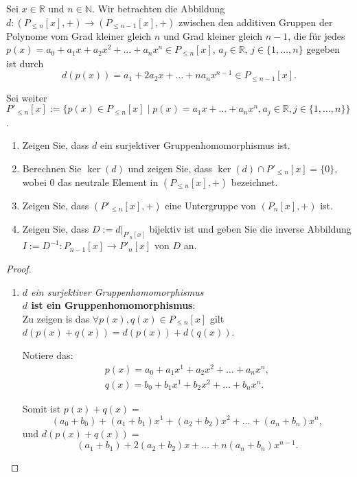 \documentclass{../problemset}
\begin{document}
\begin{problem}
Sei $x \in \mathbb{R}$ und $n \in \mathbb{N}$.
Wir betrachten die Abbildung $d: (P_{\le n }[x], +) \to (P_{\le n-1}[x], +)$ zwischen den additiven Gruppen der Polynome vom Grad kleiner gleich $n$ und Grad kleiner gleich $n - 1$, die für jedes $p(x) = a_0 + a_1x + a_2x^2 + \ldots + a_nx^n \in P_{\le n}[x]$, $a_j \in \mathbb{R}$, $j \in \{1, \ldots, n\}$ gegeben ist durch \[
	d(p(x)) = a_1 + 2a_2x + \ldots + na_nx^{n-1} \in P_{\le n-1}[x].
\]

Sei weiter $P'_{\le n}[x] := \{p(x) \in P_{\le n}[x] \mid p(x) = a_1x + \ldots + a_nx^n, a_j \in \mathbb{R}, j \in \{1, \ldots, n\}\}$.

\begin{enumerate}
	\item Zeigen Sie, dass $d$ ein surjektiver Gruppenhomomorphismus ist.
	\item Berechnen Sie $\ker(d)$ und zeigen Sie, dass $\ker(d) \cap P'_{\le n}[x] = \{0\}$, wobei $0$ das neutrale Element in $(P_{\le n}[x], +)$ bezeichnet.
	\item Zeigen Sie, dass $(P'_{\le n}[x], +)$ eine Untergruppe von $(P_n[x], +)$ ist.
	\item Zeigen Sie, dass $D := d|_{P'_n[x]}$ bijektiv ist und geben Sie die inverse Abbildung $I := D^{-1}: P_{n-1}[x] \to P'_n[x]$ von $D$ an.
\end{enumerate}

\begin{proof}
	\begin{enumerate}
		\item \textit{$d$ ein surjektiver Gruppenhomomorphismus} \\
		      \textbf{$d$ ist ein Gruppenhomomorphismus}: \\
		      Zu zeigen is das $\forall p(x),q(x) \in P_{\le n}[x]$ gilt $d(p(x) + q(x)) = d(p(x)) + d(q(x))$.

		      Notiere das:
		      \begin{align}
			      p(x) = a_0 + a_1x^1 + a_2x^2 + \ldots + a_nx^n, \\
			      q(x) = b_0 + b_1x^1 + b_2x^2 + \ldots + b_nx^n.
		      \end{align}

		      Somit ist $p(x) + q(x) =$ \[
			      (a_0+b_0) + (a_1+b_1)x^1 + (a_2 + b_2)x^2 + \ldots + (a_n+b_n)x^n,
		      \] und $d(p(x) + q(x)) =$ \[
			      (a_1+b_1) + 2(a_2 + b_2)x + \ldots + n(a_n+b_n)x^{n-1}.
		      \]


\end{enumerate}
\end{proof}
\end{problem}
\end{document}
